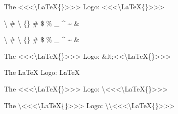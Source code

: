 
The <<<\textbackslash{}LaTeX\{\}>>> Logo: {\mktsStyleCode{}<<<\textbackslash{}LaTeX\{\}>>>}\mktsShowpar\par
\textbackslash{} \# \textbackslash{} \{\} \# \$ \% \_ \textasciicircum{} \textasciitilde{} \&\mktsShowpar\par
{\mktsStyleCode{}\textbackslash{} \# \textbackslash{} \{\} \# \$ \% \_ \textasciicircum{} \textasciitilde{} \&}\mktsShowpar\par
The <<<\textbackslash{}LaTeX\{\}>>> Logo: {\mktsStyleCode{}\&lt;<<\textbackslash{}LaTeX\{\}>>>}\mktsShowpar\par
The \LaTeX{} Logo: {\mktsStyleCode{}\LaTeX{}}\mktsShowpar\par
The <<<\textbackslash{}LaTeX\{\}>>> Logo: {\mktsStyleCode{}\textbackslash{}<<<\textbackslash{}LaTeX\{\}>>>}\mktsShowpar\par
The \textbackslash{}<<<\textbackslash{}LaTeX\{\}>>> Logo: {\mktsStyleCode{}\textbackslash{}\textbackslash{}<<<\textbackslash{}LaTeX\{\}>>>}\mktsShowpar\par

